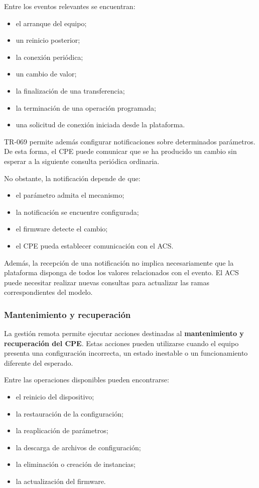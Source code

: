 Entre los eventos relevantes se encuentran:

\begin{itemize}
    \item el arranque del equipo;
    \item un reinicio posterior;
    \item la conexión periódica;
    \item un cambio de valor;
    \item la finalización de una transferencia;
    \item la terminación de una operación programada;
    \item una solicitud de conexión iniciada desde la plataforma.
\end{itemize}

TR-069 permite además configurar notificaciones sobre determinados
parámetros. De esta forma, el CPE puede comunicar que se ha producido un
cambio sin esperar a la siguiente consulta periódica ordinaria.

No obstante, la notificación depende de que:

\begin{itemize}
    \item el parámetro admita el mecanismo;
    \item la notificación se encuentre configurada;
    \item el firmware detecte el cambio;
    \item el CPE pueda establecer comunicación con el ACS.
\end{itemize}

Además, la recepción de una notificación no implica necesariamente que la
plataforma disponga de todos los valores relacionados con el evento. El
ACS puede necesitar realizar nuevas consultas para actualizar las ramas
correspondientes del modelo.


\subsubsection*{Mantenimiento y recuperación}

La gestión remota permite ejecutar acciones destinadas al
\textbf{mantenimiento y recuperación del CPE}. Estas acciones pueden
utilizarse cuando el equipo presenta una configuración incorrecta, un
estado inestable o un funcionamiento diferente del esperado.

Entre las operaciones disponibles pueden encontrarse:

\begin{itemize}
    \item el reinicio del dispositivo;
    \item la restauración de la configuración;
    \item la reaplicación de parámetros;
    \item la descarga de archivos de configuración;
    \item la eliminación o creación de instancias;
    \item la actualización del firmware.
\end{itemize}

